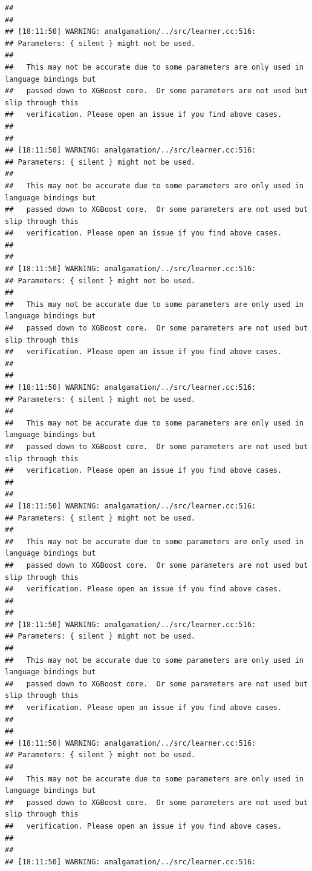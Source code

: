 \documentclass[AMS,STIX2COL]{WileyNJD-v2}\usepackage[]{graphicx}\usepackage[]{color}
\makeatletter
\newenvironment{kframe}{%
 \def\at@end@of@kframe{}%
 \ifinner\ifhmode%
  \def\at@end@of@kframe{\end{minipage}}%
  \begin{minipage}{\columnwidth}%
 \fi\fi%
 \def\FrameCommand##1{\hskip\@totalleftmargin \hskip-\fboxsep
 \colorbox{shadecolor}{##1}\hskip-\fboxsep
     \hskip-\linewidth \hskip-\@totalleftmargin \hskip\columnwidth}%
 \MakeFramed {\advance\hsize-\width
   \@totalleftmargin\z@ \linewidth\hsize
   \@setminipage}}%
 {\par\unskip\endMakeFramed%
 \at@end@of@kframe}
\newenvironment{knitrout}{}{} %
\makeatother
\begin{document}
\begin{knitrout}
\begin{kframe}
\begin{verbatim}
## 
## 
## [18:11:50] WARNING: amalgamation/../src/learner.cc:516: 
## Parameters: { silent } might not be used.
## 
##   This may not be accurate due to some parameters are only used in language bindings but
##   passed down to XGBoost core.  Or some parameters are not used but slip through this
##   verification. Please open an issue if you find above cases.
## 
## 
## [18:11:50] WARNING: amalgamation/../src/learner.cc:516: 
## Parameters: { silent } might not be used.
## 
##   This may not be accurate due to some parameters are only used in language bindings but
##   passed down to XGBoost core.  Or some parameters are not used but slip through this
##   verification. Please open an issue if you find above cases.
## 
## 
## [18:11:50] WARNING: amalgamation/../src/learner.cc:516: 
## Parameters: { silent } might not be used.
## 
##   This may not be accurate due to some parameters are only used in language bindings but
##   passed down to XGBoost core.  Or some parameters are not used but slip through this
##   verification. Please open an issue if you find above cases.
## 
## 
## [18:11:50] WARNING: amalgamation/../src/learner.cc:516: 
## Parameters: { silent } might not be used.
## 
##   This may not be accurate due to some parameters are only used in language bindings but
##   passed down to XGBoost core.  Or some parameters are not used but slip through this
##   verification. Please open an issue if you find above cases.
## 
## 
## [18:11:50] WARNING: amalgamation/../src/learner.cc:516: 
## Parameters: { silent } might not be used.
## 
##   This may not be accurate due to some parameters are only used in language bindings but
##   passed down to XGBoost core.  Or some parameters are not used but slip through this
##   verification. Please open an issue if you find above cases.
## 
## 
## [18:11:50] WARNING: amalgamation/../src/learner.cc:516: 
## Parameters: { silent } might not be used.
## 
##   This may not be accurate due to some parameters are only used in language bindings but
##   passed down to XGBoost core.  Or some parameters are not used but slip through this
##   verification. Please open an issue if you find above cases.
## 
## 
## [18:11:50] WARNING: amalgamation/../src/learner.cc:516: 
## Parameters: { silent } might not be used.
## 
##   This may not be accurate due to some parameters are only used in language bindings but
##   passed down to XGBoost core.  Or some parameters are not used but slip through this
##   verification. Please open an issue if you find above cases.
## 
## 
## [18:11:50] WARNING: amalgamation/../src/learner.cc:516: 

\end{verbatim}
\end{kframe}
\end{knitrout}
\end{document}
